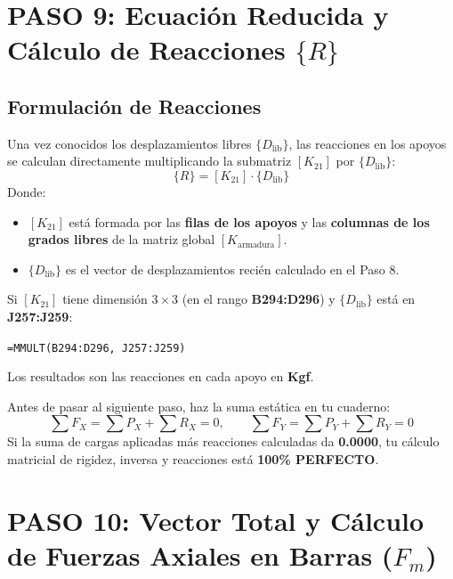 \documentclass[10pt,a4paper]{article}
\begin{document}
\section{PASO 9: Ecuación Reducida y Cálculo de Reacciones \texorpdfstring{$\{R\}$}{R}}

\subsection{Formulación de Reacciones}
Una vez conocidos los desplazamientos libres $\{D_{\text{lib}}\}$, las reacciones en los apoyos se calculan directamente multiplicando la submatriz $[K_{21}]$ por $\{D_{\text{lib}}\}$:
\[
\{R\} = [K_{21}] \cdot \{D_{\text{lib}}\}
\]
Donde:
\begin{itemize}
    \item $[K_{21}]$ está formada por las \textbf{filas de los apoyos} y las \textbf{columnas de los grados libres} de la matriz global $[K_{\text{armadura}}]$.
    \item $\{D_{\text{lib}}\}$ es el vector de desplazamientos recién calculado en el Paso 8.
\end{itemize}

\begin{excelbox}
Si $[K_{21}]$ tiene dimensión $3 \times 3$ (en el rango \textbf{B294:D296}) y $\{D_{\text{lib}}\}$ está en \textbf{J257:J259}:
\begin{center}
\texttt{=MMULT(B294:D296, J257:J259)}
\end{center}
Los resultados son las reacciones en cada apoyo en \textbf{Kgf}.
\end{excelbox}

\begin{warningbox}
Antes de pasar al siguiente paso, haz la suma estática en tu cuaderno:
\[
\sum F_X = \sum P_X + \sum R_X = 0, \qquad \sum F_Y = \sum P_Y + \sum R_Y = 0
\]
Si la suma de cargas aplicadas más reacciones calculadas da \textbf{0.0000}, tu cálculo matricial de rigidez, inversa y reacciones está \textbf{100\% PERFECTO}.
\end{warningbox}

\newpage

\section{PASO 10: Vector Total y Cálculo de Fuerzas Axiales en Barras (\texorpdfstring{$F_m$}{Fm})}
\end{document}
